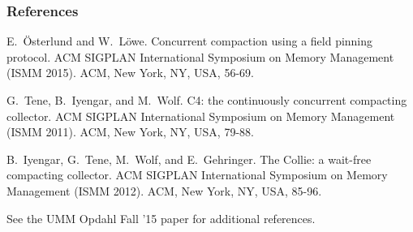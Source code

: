 \documentclass{beamer}
\newcommand{\linespace}{\vskip 0.25cm}
\begin{document}
\begin{frame} 
	\frametitle{References} 
	
%	
%	
%  
%	

\begin{thebibliography}{lskdjf}

E.~\"{O}sterlund and W.~L\"{o}we.
\newblock Concurrent compaction using a field pinning protocol. 
 ACM SIGPLAN International Symposium on Memory Management (ISMM 2015). ACM, New York, NY, USA, 56-69.

G.~Tene, B.~Iyengar, and M.~Wolf.
\newblock C4: the continuously concurrent compacting collector.
 ACM SIGPLAN International Symposium on Memory Management (ISMM 2011). ACM, New York, NY, USA, 79-88.

B.~Iyengar, G.~Tene, M.~Wolf, and E.~Gehringer.
\newblock The Collie: a wait-free compacting collector.
 ACM SIGPLAN International Symposium on Memory Management (ISMM 2012). ACM, New York, NY, USA, 85-96.

\linespace
\begin{center}
\color{black}See the UMM Opdahl Fall '15 paper for additional references.
\end{center}


\end{thebibliography}

\end{frame} 
\end{document}
